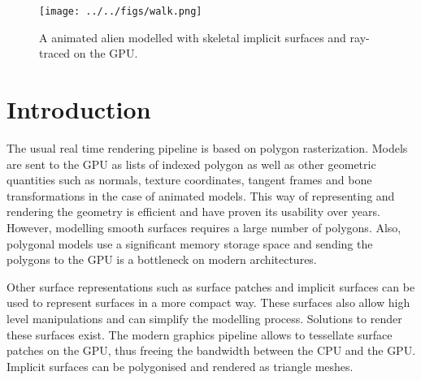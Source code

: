 \documentclass[annual]{acmsiggraph}
\begin{document}


\keywordlist




\copyrightspace

\begin{figure}[ht]
  \centering
  \texttt{[image: ../../figs/walk.png]}
  \caption{A animated alien modelled with skeletal implicit surfaces and ray-traced on the GPU.}
\end{figure}

\section{Introduction}

The usual real time rendering pipeline is based on polygon rasterization. Models are sent to the GPU as lists of indexed polygon as well as other geometric quantities such as normals, texture coordinates, tangent frames and bone transformations in the case of animated models. This way of representing and rendering the geometry is efficient and have proven its usability over years. However, modelling smooth surfaces requires a large number of polygons. Also, polygonal models use a significant memory storage space and sending the polygons to the GPU is a bottleneck on modern architectures.

Other surface representations such as surface patches and implicit surfaces can be used to represent surfaces in a more compact way. These surfaces also allow high level manipulations and can simplify the modelling process. Solutions to render these surfaces exist. The modern graphics pipeline allows to tessellate surface patches on the GPU, thus freeing the bandwidth between the CPU and the GPU. Implicit surfaces can be polygonised and rendered as triangle meshes.
\end{document}
